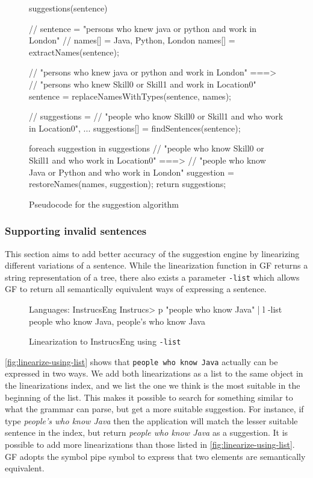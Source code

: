 \begin{figure}[H]
\begin{java-code}
suggestions(sentence) {
    // sentence = "persons who knew java or python and work in London"
    // names[] = {Java, Python, London}
    names[] = extractNames(sentence);
    
    // "persons who knew java or python and work in London" ===> 
    // "persons who knew Skill0 or Skill1 and work in Location0"
    sentence = replaceNamesWithTypes(sentence, names);
    
    // suggestions =
    //   { "people who know Skill0 or Skill1 and who work in Location0", ... }
    suggestions[] = findSentences(sentence);
    
    foreach suggestion in suggestions {
        // "people who know Skill0 or Skill1 and who work in Location0" ===> 
        // "people who know Java or Python and who work in London"
        suggestion = restoreNames(names, suggestion);
    } 
    return suggestions; 
}
\end{java-code}
\caption{Pseudocode for the suggestion algorithm\label{fig:psuedocode-suggestions}}
\end{figure}

\subsubsection{Supporting invalid sentences}
This section aims to add better accuracy of the suggestion engine by linearizing different variations of a sentence. While the linearization function in GF returns a string representation of a tree, there also exists a parameter \texttt{-list} which allows GF to return all semantically equivalent ways of expressing a sentence.

\begin{figure}[H]
\begin{terminal}
Languages: InstrucsEng
Instrucs> p "people who know Java" | l -list
people who know Java, people's who know Java
\end{terminal}
\caption{Linearization to InstrucsEng using \texttt{-list}\label{fig:linearize-using-list}}
\end{figure}

\autoref{fig:linearize-using-list} shows that \texttt{people who know Java} actually can be expressed in two ways. We add both linearizations as a list to the same object in the linearizations index, and we list the one we think is the most suitable in the beginning of the list. This makes it possible to search for something similar to what the grammar can parse, but get a more suitable suggestion. For instance, if type \emph{people's who know Java} then the application will match the lesser suitable sentence in the index, but return \emph{people who know Java} as a suggestion.
\newline
\newline
It is possible to add more linearizations than those listed in \autoref{fig:linearize-using-list}. GF adopts the symbol pipe symbol to express that two elements are semantically equivalent. 

